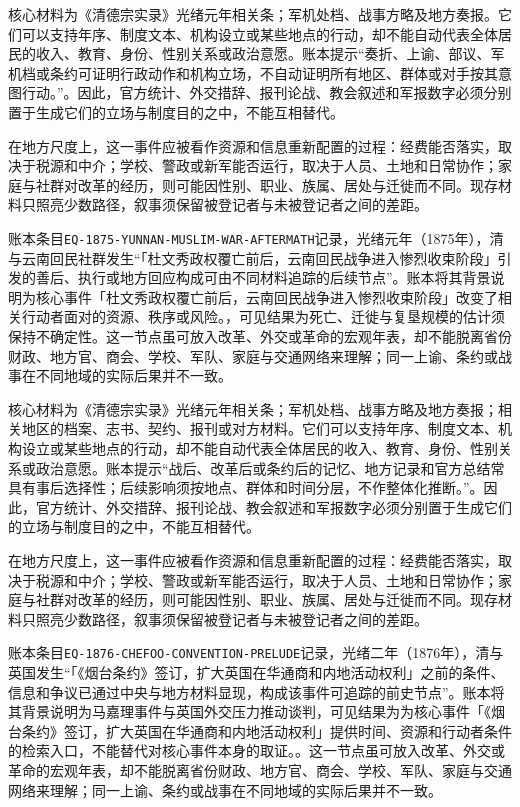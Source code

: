 核心材料为《清德宗实录》光绪元年相关条；军机处档、战事方略及地方奏报。它们可以支持年序、制度文本、机构设立或某些地点的行动，却不能自动代表全体居民的收入、教育、身份、性别关系或政治意愿。账本提示“奏折、上谕、部议、军机档或条约可证明行政动作和机构立场，不自动证明所有地区、群体或对手按其意图行动。”。因此，官方统计、外交措辞、报刊论战、教会叙述和军报数字必须分别置于生成它们的立场与制度目的之中，不能互相替代。

在地方尺度上，这一事件应被看作资源和信息重新配置的过程：经费能否落实，取决于税源和中介；学校、警政或新军能否运行，取决于人员、土地和日常协作；家庭与社群对改革的经历，则可能因性别、职业、族属、居处与迁徙而不同。现存材料只照亮少数路径，叙事须保留被登记者与未被登记者之间的差距。

账本条目\texttt{EQ-1875-YUNNAN-MUSLIM-WAR-AFTERMATH}记录，光绪元年（1875年），清与云南回民社群发生“「杜文秀政权覆亡前后，云南回民战争进入惨烈收束阶段」引发的善后、执行或地方回应构成可由不同材料追踪的后续节点”。账本将其背景说明为核心事件「杜文秀政权覆亡前后，云南回民战争进入惨烈收束阶段」改变了相关行动者面对的资源、秩序或风险。，可见结果为死亡、迁徙与复垦规模的估计须保持不确定性。这一节点虽可放入改革、外交或革命的宏观年表，却不能脱离省份财政、地方官、商会、学校、军队、家庭与交通网络来理解；同一上谕、条约或战事在不同地域的实际后果并不一致。

核心材料为《清德宗实录》光绪元年相关条；军机处档、战事方略及地方奏报；相关地区的档案、志书、契约、报刊或对方材料。它们可以支持年序、制度文本、机构设立或某些地点的行动，却不能自动代表全体居民的收入、教育、身份、性别关系或政治意愿。账本提示“战后、改革后或条约后的记忆、地方记录和官方总结常具有事后选择性；后续影响须按地点、群体和时间分层，不作整体化推断。”。因此，官方统计、外交措辞、报刊论战、教会叙述和军报数字必须分别置于生成它们的立场与制度目的之中，不能互相替代。

在地方尺度上，这一事件应被看作资源和信息重新配置的过程：经费能否落实，取决于税源和中介；学校、警政或新军能否运行，取决于人员、土地和日常协作；家庭与社群对改革的经历，则可能因性别、职业、族属、居处与迁徙而不同。现存材料只照亮少数路径，叙事须保留被登记者与未被登记者之间的差距。

账本条目\texttt{EQ-1876-CHEFOO-CONVENTION-PRELUDE}记录，光绪二年（1876年），清与英国发生“「《烟台条约》签订，扩大英国在华通商和内地活动权利」之前的条件、信息和争议已通过中央与地方材料显现，构成该事件可追踪的前史节点”。账本将其背景说明为马嘉理事件与英国外交压力推动谈判，可见结果为为核心事件「《烟台条约》签订，扩大英国在华通商和内地活动权利」提供时间、资源和行动者条件的检索入口，不能替代对核心事件本身的取证。。这一节点虽可放入改革、外交或革命的宏观年表，却不能脱离省份财政、地方官、商会、学校、军队、家庭与交通网络来理解；同一上谕、条约或战事在不同地域的实际后果并不一致。

